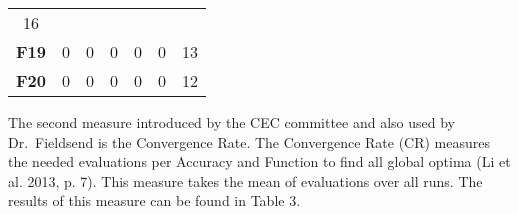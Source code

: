 \documentclass[12pt,a4paper]{article}
\begin{document}
\begin{longtable}[c]{@{}crrrrrr@{}}
\begin{minipage}[t]{0.07\columnwidth}
16
\strut\end{minipage}\tabularnewline
\begin{minipage}[t]{0.11\columnwidth}\centering\strut
\textbf{F19}
\strut\end{minipage} &
\begin{minipage}[t]{0.07\columnwidth}\raggedleft\strut
0
\strut\end{minipage} &
\begin{minipage}[t]{0.08\columnwidth}\raggedleft\strut
0
\strut\end{minipage} &
\begin{minipage}[t]{0.09\columnwidth}\raggedleft\strut
0
\strut\end{minipage} &
\begin{minipage}[t]{0.10\columnwidth}\raggedleft\strut
0
\strut\end{minipage} &
\begin{minipage}[t]{0.11\columnwidth}\raggedleft\strut
0
\strut\end{minipage} &
\begin{minipage}[t]{0.07\columnwidth}\raggedleft\strut
13
\strut\end{minipage}\tabularnewline
\begin{minipage}[t]{0.11\columnwidth}\centering\strut
\textbf{F20}
\strut\end{minipage} &
\begin{minipage}[t]{0.07\columnwidth}\raggedleft\strut
0
\strut\end{minipage} &
\begin{minipage}[t]{0.08\columnwidth}\raggedleft\strut
0
\strut\end{minipage} &
\begin{minipage}[t]{0.09\columnwidth}\raggedleft\strut
0
\strut\end{minipage} &
\begin{minipage}[t]{0.10\columnwidth}\raggedleft\strut
0
\strut\end{minipage} &
\begin{minipage}[t]{0.11\columnwidth}\raggedleft\strut
0
\strut\end{minipage} &
\begin{minipage}[t]{0.07\columnwidth}\raggedleft\strut
12
\strut\end{minipage}\tabularnewline
\bottomrule
\end{longtable}

The second measure introduced by the CEC committee and also used by
Dr.~Fieldsend is the Convergence Rate. The Convergence Rate (CR)
measures the needed evaluations per Accuracy and Function to find all
global optima (Li et al. 2013, p. 7). This measure takes the mean of
evaluations over all runs. The results of this measure can be found in
Table 3.
\end{document}
